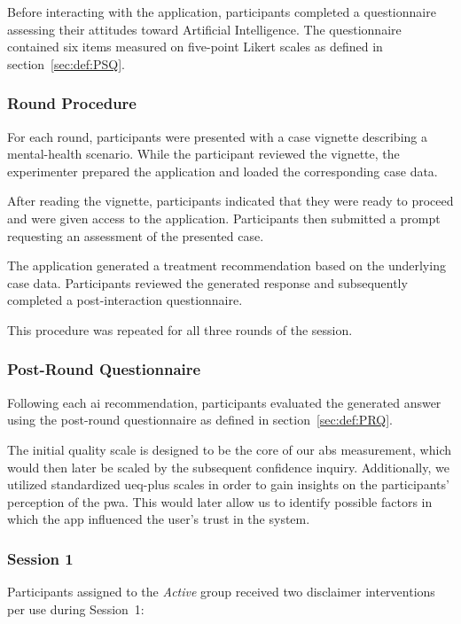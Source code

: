\documentclass[sigconf,natbib=false]{acmart}
\begin{document}
Before interacting with the application, participants completed a questionnaire assessing their attitudes toward Artificial Intelligence.
The questionnaire contained six items measured on five-point Likert scales as defined in section~\ref{sec:def:PSQ}.

\subsubsection{Round Procedure}

For each round, participants were presented with a case vignette describing a mental-health scenario.
While the participant reviewed the vignette, the experimenter prepared the application and loaded the corresponding case data.


After reading the vignette, participants indicated that they were ready to proceed and were given access to the application.
Participants then submitted a prompt requesting an assessment of the presented case.

The application generated a treatment recommendation based on the underlying case data.
Participants reviewed the generated response and subsequently completed a post-interaction questionnaire.

This procedure was repeated for all three rounds of the session.

\subsubsection{Post-Round Questionnaire}

Following each \Gls{ai} recommendation, participants evaluated the generated answer using the post-round questionnaire as defined in section~\ref{sec:def:PRQ}.

The initial quality scale is designed to be the core of our \acrfull{abs} measurement, which would then later be scaled by the subsequent confidence inquiry.
Additionally, we utilized standardized \gls{ueq-plus} scales in order to gain insights on the participants' perception of the \gls{pwa}.
This would later allow us to identify possible factors in which the app influenced the user's trust in the system.

 \subsubsection{Session 1}

Participants assigned to the \textit{Active} group received two disclaimer interventions per use during Session~1:
\end{document}
